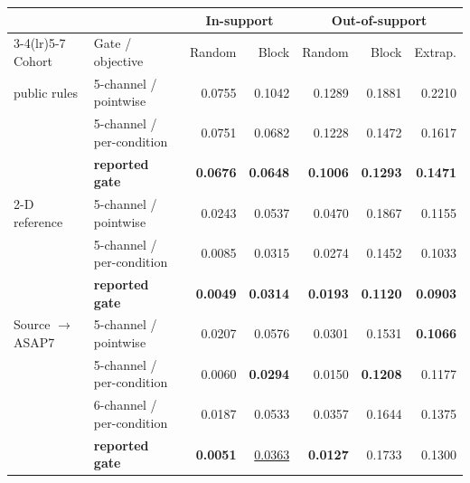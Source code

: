 \scriptsize
\setlength{\tabcolsep}{3pt}
\begin{tabular*}{\linewidth}{@{\extracolsep{\fill}}llrrrrr@{}}\toprule
 &  & \multicolumn{2}{c}{In-support} & \multicolumn{3}{c}{Out-of-support} \\
\cmidrule(lr){3-4}\cmidrule(lr){5-7}
Cohort & Gate / objective & Random & Block & Random & Block & Extrap. \\
\midrule
public rules & 5-channel / pointwise & 0.0755 & 0.1042 & 0.1289 & 0.1881 & 0.2210 \\
 & 5-channel / per-condition & 0.0751 & 0.0682 & 0.1228 & 0.1472 & 0.1617 \\
 & \textbf{reported gate} & \textbf{0.0676} & \textbf{0.0648} & \textbf{0.1006} & \textbf{0.1293} & \textbf{0.1471} \\
\midrule
2-D reference & 5-channel / pointwise & 0.0243 & 0.0537 & 0.0470 & 0.1867 & 0.1155 \\
 & 5-channel / per-condition & 0.0085 & 0.0315 & 0.0274 & 0.1452 & 0.1033 \\
 & \textbf{reported gate} & \textbf{0.0049} & \textbf{0.0314} & \textbf{0.0193} & \textbf{0.1120} & \textbf{0.0903} \\
\midrule
Source $\to$ ASAP7 & 5-channel / pointwise & 0.0207 & 0.0576 & 0.0301 & 0.1531 & \textbf{0.1066} \\
 & 5-channel / per-condition & 0.0060 & \textbf{0.0294} & 0.0150 & \textbf{0.1208} & 0.1177 \\
 & 6-channel / per-condition & 0.0187 & 0.0533 & 0.0357 & 0.1644 & 0.1375 \\
 & \textbf{reported gate} & \textbf{0.0051} & \underline{0.0363} & \textbf{0.0127} & 0.1733 & 0.1300 \\
\bottomrule\end{tabular*}

